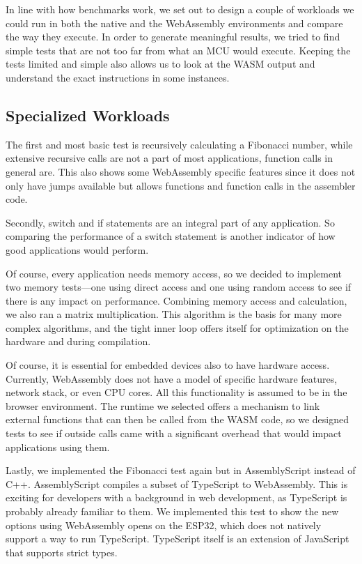 In line with how benchmarks work, we set out to design a couple of workloads we could run in both the native and the WebAssembly environments and compare the way they execute. In order to generate meaningful results, we tried to find simple tests that are not too far from what an MCU would execute. Keeping the tests limited and simple also allows us to look at the WASM output and understand the exact instructions in some instances.

\subsection{Specialized Workloads}

The first and most basic test is recursively calculating a Fibonacci number, while extensive recursive calls are not a part of most applications, function calls in general are. This also shows some WebAssembly specific features since it does not only have jumps available but allows functions and function calls in the assembler code.

Secondly, switch and if statements are an integral part of any application. So comparing the performance of a switch statement is another indicator of how good applications would perform.

Of course, every application needs memory access, so we decided to implement two memory tests—one using direct access and one using random access to see if there is any impact on performance. Combining memory access and calculation, we also ran a matrix multiplication. This algorithm is the basis for many more complex algorithms, and the tight inner loop offers itself for optimization on the hardware and during compilation.

Of course, it is essential for embedded devices also to have hardware access. Currently, WebAssembly does not have a model of specific hardware features, network stack, or even CPU cores. All this functionality is assumed to be in the browser environment. The runtime we selected offers a mechanism to link external functions that can then be called from the WASM code, so we designed tests to see if outside calls came with a significant overhead that would impact applications using them.

Lastly, we implemented the Fibonacci test again but in AssemblyScript instead of C++. AssemblyScript \autocite{noauthor_assemblyscriptassemblyscript_2020} compiles a subset of TypeScript to WebAssembly. This is exciting for developers with a background in web development, as TypeScript is probably already familiar to them. We implemented this test to show the new options using WebAssembly opens on the ESP32, which does not natively support a way to run TypeScript. TypeScript itself is an extension of JavaScript that supports strict types.

